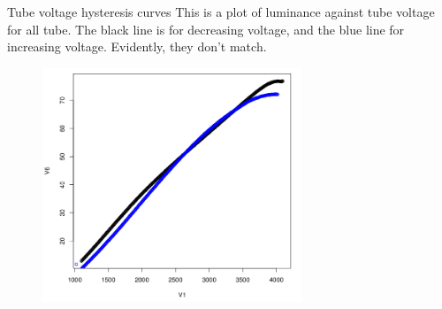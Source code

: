 \documentclass{beamer}
\begin{document}
\begin{frame}[t]{Tube voltage hysteresis curves}
This is a plot of luminance against tube voltage for all tube. The black line is for decreasing voltage, and the blue line for increasing voltage. Evidently, they don't match.
\begin{figure}[c]
\includegraphics[height=7cm]{allhysteresis.png}
\end{figure}
\end{frame}
\end{document}
